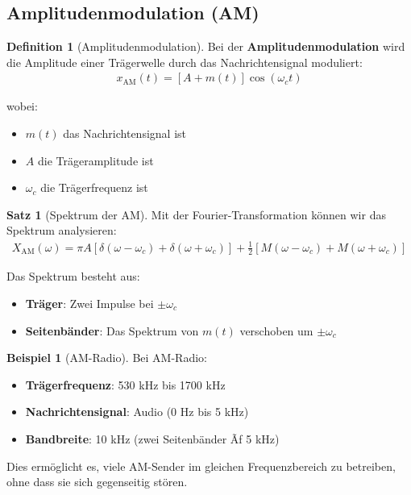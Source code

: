 ﻿\documentclass[a4paper,12pt]{report}
\theoremstyle{definition}
\newtheorem{definition}{Definition}
\newtheorem{beispiel}{Beispiel}
\newtheorem{satz}{Satz}
\begin{document}
	\subsection{Amplitudenmodulation (AM)}
	
	\begin{definition}[Amplitudenmodulation]
		Bei der \textbf{Amplitudenmodulation} wird die Amplitude einer Trägerwelle durch das Nachrichtensignal moduliert:
		\begin{align}
			x_{\text{AM}}(t) = [A + m(t)] \cos(\omega_c t)
		\end{align}
		
		wobei:
		\begin{itemize}
			\item[-] $m(t)$ das Nachrichtensignal ist
			\item[-] $A$ die Trägeramplitude ist
			\item[-] $\omega_c$ die Trägerfrequenz ist
		\end{itemize}
	\end{definition}
	
	\begin{satz}[Spektrum der AM]
		Mit der Fourier-Transformation können wir das Spektrum analysieren:
		\begin{align}
			X_{\text{AM}}(\omega) = \pi A [\delta(\omega - \omega_c) + \delta(\omega + \omega_c)] + \frac{1}{2}[M(\omega - \omega_c) + M(\omega + \omega_c)]
		\end{align}
		
		Das Spektrum besteht aus:
		\begin{itemize}
			\item[-] \textbf{Träger}: Zwei Impulse bei $\pm\omega_c$
			\item[-] \textbf{Seitenbänder}: Das Spektrum von $m(t)$ verschoben um $\pm\omega_c$
		\end{itemize}
	\end{satz}
	
	\begin{beispiel}[AM-Radio]
		Bei AM-Radio:
		\begin{itemize}
			\item[-] \textbf{Trägerfrequenz}: 530 kHz bis 1700 kHz
			\item[-] \textbf{Nachrichtensignal}: Audio (0 Hz bis 5 kHz)
			\item[-] \textbf{Bandbreite}: 10 kHz (zwei Seitenbänder Ãƒ  5 kHz)
		\end{itemize}
		
		Dies ermöglicht es, viele AM-Sender im gleichen Frequenzbereich zu betreiben, ohne dass sie sich gegenseitig stören.
	\end{beispiel}
	
\end{document}
